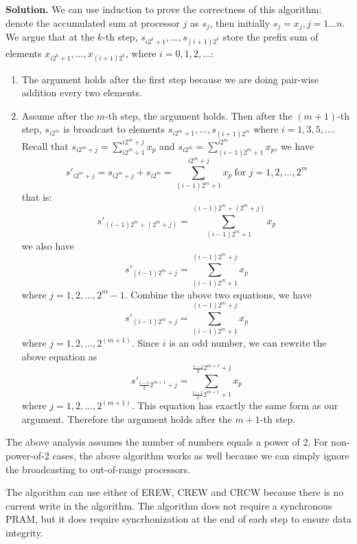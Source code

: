 \documentclass{article}
\theoremstyle{definition}
\newenvironment{solution}{\noindent\textbf{Solution.}}{\bigbreak}
\begin{document}
\begin{solution}
  We can use induction to prove the correctness of this algorithm: denote the accumulated sum at processor $j$ as $s_j$,
  then initially $s_j = x_j, j=1\ldots n$. We argue that at the $k$-th step, $s_{i2^k+1}, \ldots, s_{(i+1)2^k}$ store the
  prefix sum of elements $x_{i2^k+1}, \ldots, x_{(i+1)2^k}$, where $i = 0, 1, 2, \ldots$:
  \begin{enumerate}
  \item The argument holds after the first step because we are doing pair-wise addition every two elements.
  \item Assume after the $m$-th step, the argument holds. Then after the $(m+1)$-th step, $s_{i2^m}$ is broadcast to elements
  $s_{i2^m+1}, \ldots, s_{(i+1)2^m}$ where $i=1, 3, 5, \ldots$. Recall that $s_{i2^m+j} = \sum_{i2^m+1}^{i2^m+j}x_p$ and
  $s_{i2^m} = \sum_{(i-1)2^m+1}^{i2^m}x_p$, we have
  \[s'_{i2^m+j} = s_{i2^m+j} + s_{i2^m} = \sum_{(i-1)2^m+1}^{i2^m+j}x_p~\text{for~}j=1,2,\ldots,2^m\]
  that is:
  \[s'_{(i-1)2^m + (2^m+j)} = \sum_{(i-1)2^m+1}^{(i-1)2^m+(2^m+j)}x_p\]
  we also have
  \[s'_{(i-1)2^m + j} = \sum_{(i-1)2^m+1}^{(i-1)2^m+j}x_p\]
  where $j = 1, 2, \ldots, 2^m-1$.
  Combine the above two equations, we have
  \[s'_{(i-1)2^m + j} = \sum_{(i-1)2^m+1}^{(i-1)2^m+j}x_p\]
  where $j = 1, 2, \ldots, 2^{(m+1)}$.
  Since $i$ is an odd number, we can rewrite the above equation as
  \[s'_{\frac{i-1}{2}2^{m+1} + j} = \sum_{\frac{i-1}{2}2^{m+1}+1}^{\frac{i-1}{2}2^{m+1}+j}x_p\]
  where $j = 1, 2, \ldots, 2^{(m+1)}$. This equation has exactly the same form as our argument. Therefore the argument holds after
  the $m+1$-th step.
  \end{enumerate}
  The above analysis assumes the number of numbers equals a power of 2. For non-power-of-2 cases, the above algorithm works as well
  because we can simply ignore the broadcasting to out-of-range processors.

  The algorithm can use either of EREW, CREW and CRCW because there is no current write in the algorithm. The algorithm does not require
  a synchronous PRAM, but it does require syncrhonization at the end of each step to ensure data integrity.
\end{solution}
\end{document}
